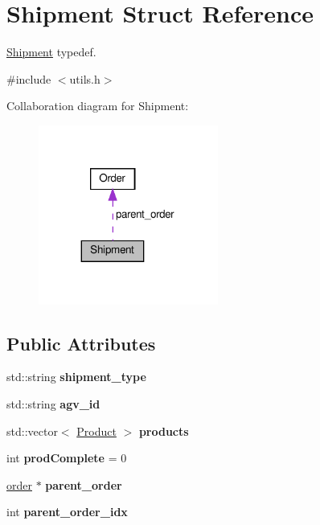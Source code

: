 \hypertarget{structShipment}{}\section{Shipment Struct Reference}
\label{structShipment}


\hyperlink{structShipment}{Shipment} typedef.  




{\ttfamily \#include $<$utils.\+h$>$}



Collaboration diagram for Shipment\+:
\nopagebreak
\begin{figure}[H]
\begin{center}
\leavevmode
\includegraphics[width=167pt]{structShipment__coll__graph}
\end{center}
\end{figure}
\subsection*{Public Attributes}
\begin{DoxyCompactItemize}
\item 
\mbox{\label{structShipment_afee83324bb0718df0bad07ddd6bfa698}} 
std\+::string {\bfseries shipment\+\_\+type}
\item 
\mbox{\label{structShipment_a99c0e2efeb36ae051bebfee925076af1}} 
std\+::string {\bfseries agv\+\_\+id}
\item 
\mbox{\label{structShipment_a549d2e4b2e90019d18e55110593e790f}} 
std\+::vector$<$ \hyperlink{structProduct}{Product} $>$ {\bfseries products}
\item 
\mbox{\label{structShipment_a3d5cdc2669ff03bb010989818e5e2369}} 
int {\bfseries prod\+Complete} = 0
\item 
\mbox{\label{structShipment_a1f5c06a24c0915d76b7bea80f3bd8d31}} 
\hyperlink{utils_8h_a88b083f4969e7c61a34a7231180f9e41}{order} $\ast$ {\bfseries parent\+\_\+order}
\item 
\mbox{\label{structShipment_aac7fdf0f481c7ed76496a38f37d300ab}} 
int {\bfseries parent\+\_\+order\+\_\+idx}
\end{DoxyCompactItemize}



